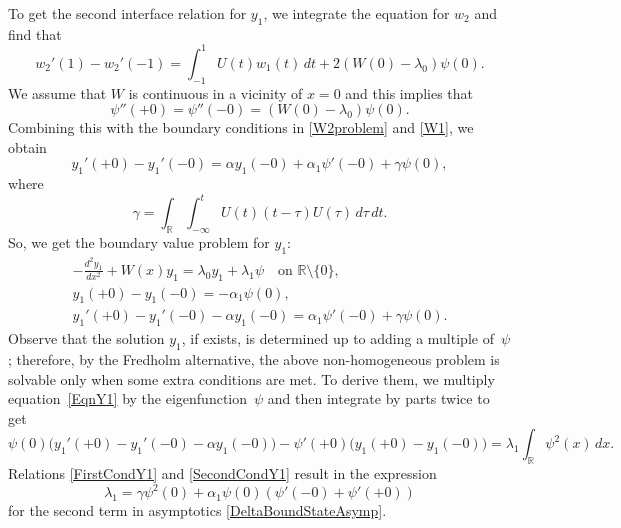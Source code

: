 \documentclass[reqno]{amsart}
\theoremstyle{definition}
\theoremstyle{remark}
\numberwithin{equation}{section}
\newcommand{\Real}{\mathbb R}
\begin{document}
To get the second interface relation for $y_1$, we integrate the equation for $w_2$ and find that
\begin{equation*}
  w_2'(1)-w_2'(-1)=\int_{-1}^1U(t)w_1(t)\,dt+ 2(W(0)-\lambda_0)\psi(0).
\end{equation*}
We assume that $W$ is continuous in a vicinity of $x=0$ and this implies that
\begin{equation*}
 \psi''(+0)=\psi''(-0)=(W(0)-\lambda_0)\psi(0).
\end{equation*}
Combining this with the boundary conditions in \eqref{W2problem} and \eqref{W1}, we obtain
\begin{equation*}
    y_1'(+0)-y_1'(-0)=\alpha y_1(-0)
    +\alpha_1\psi'(-0)+ \gamma \psi(0),
\end{equation*}
where
\begin{equation*}
  \gamma=\int_\Real\int_{-\infty}^tU(t)(t-\tau)U(\tau)\,d\tau\,dt.
\end{equation*}
So, we get the boundary value problem for $y_1$:
\begin{gather}\label{EqnY1}
  -\frac{d^2y_1}{dx^2}+W(x)y_1=\lambda_0 y_1+\lambda_1 \psi\quad\text{on }\Real\setminus\{0\},
  \\\label{FirstCondY1}
  y_1(+0)-y_1(-0)=-\alpha_1\psi(0),
  \\\label{SecondCondY1}
  y_1'(+0)-y_1'(-0)-\alpha y_1(-0)=\alpha_1\psi'(-0)+ \gamma \psi(0).
\end{gather}
Observe that the solution $y_1$, if exists, is determined up to adding a multiple of~$\psi$; therefore, by the Fredholm alternative, the above non-homogeneous problem is solvable only when some extra conditions are met. To derive them, we multiply equation~\eqref{EqnY1} by the eigenfunction~$\psi$ and then integrate by parts twice to get
\begin{equation*}
	\psi(0)\big(y_1'(+0)-y_1'(-0)-\alpha y_1(-0)\big)-\psi'(+0)\big(y_1(+0)-y_1(-0)\big)=\lambda_1\int_{\Real} \psi^2(x)\,dx.
\end{equation*}
Relations \eqref{FirstCondY1} and \eqref{SecondCondY1} result in the expression
\begin{equation*}
	\lambda_1=\gamma  \psi^2(0)+\alpha_1 \psi(0)(\psi'(-0)+\psi'(+0))
\end{equation*}
for the second term in asymptotics \eqref{DeltaBoundStateAsymp}.
\end{document}
